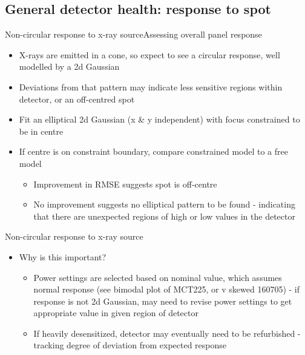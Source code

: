 \documentclass{beamer}
\begin{document}

\subsection{General detector health: response to spot}


\begin{frame}{Non-circular response to x-ray source}{Assessing overall panel response}
  \begin{itemize}
  	\item X-rays are emitted in a cone, so expect to see a circular response, well modelled by a 2d Gaussian
  	\item Deviations from that pattern may indicate less sensitive regions within detector, or an off-centred spot
  	
  	\item Fit an elliptical 2d Gaussian (x \& y independent) with focus constrained to be in centre
  	\item If centre is on constraint boundary, compare constrained model to a free model
  	\begin{itemize}
  		\item Improvement in RMSE suggests spot is off-centre
  		\item No improvement suggests no elliptical pattern to be found - indicating that there are unexpected regions of high or low values in the detector
	\end{itemize}
  \end{itemize}
\end{frame}

\begin{frame}{Non-circular response to x-ray source}
  \begin{itemize}
  	\item Why is this important?
	\begin{itemize}
		\item Power settings are selected based on nominal value, which assumes normal response (see bimodal plot of MCT225, or v skewed 160705) - if response is not 2d Gaussian, may need to revise power settings to get appropriate value in given region of detector
		\item If heavily desensitized, detector may eventually need to be refurbished - tracking degree of deviation from expected response 
	\end{itemize}		 
  \end{itemize}
\end{frame}
\end{document}
